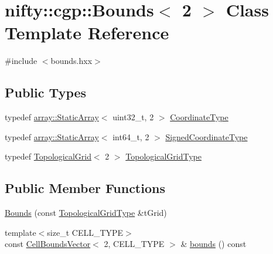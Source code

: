 \hypertarget{classnifty_1_1cgp_1_1Bounds_3_012_01_4}{}\section{nifty\+:\+:cgp\+:\+:Bounds$<$ 2 $>$ Class Template Reference}
\label{classnifty_1_1cgp_1_1Bounds_3_012_01_4}


{\ttfamily \#include $<$bounds.\+hxx$>$}

\subsection*{Public Types}
\begin{DoxyCompactItemize}
\item 
typedef \hyperlink{namespacenifty_1_1array_a683f151f19c851754e0c6d55ed16a0c2}{array\+::\+Static\+Array}$<$ uint32\+\_\+t, 2 $>$ \hyperlink{classnifty_1_1cgp_1_1Bounds_3_012_01_4_aa7c3be371d84aea05e916a30d859d7ff}{Coordinate\+Type}
\item 
typedef \hyperlink{namespacenifty_1_1array_a683f151f19c851754e0c6d55ed16a0c2}{array\+::\+Static\+Array}$<$ int64\+\_\+t, 2 $>$ \hyperlink{classnifty_1_1cgp_1_1Bounds_3_012_01_4_aa2abaddff55015fc8a158881f4e90571}{Signed\+Coordinate\+Type}
\item 
typedef \hyperlink{classnifty_1_1cgp_1_1TopologicalGrid}{Topological\+Grid}$<$ 2 $>$ \hyperlink{classnifty_1_1cgp_1_1Bounds_3_012_01_4_a97f375ade92ba9870b7a31da87626337}{Topological\+Grid\+Type}
\end{DoxyCompactItemize}
\subsection*{Public Member Functions}
\begin{DoxyCompactItemize}
\item 
\hyperlink{classnifty_1_1cgp_1_1Bounds_3_012_01_4_aadcad33a9b3fa58464bae7aae61f3f5d}{Bounds} (const \hyperlink{classnifty_1_1cgp_1_1Bounds_3_012_01_4_a97f375ade92ba9870b7a31da87626337}{Topological\+Grid\+Type} \&t\+Grid)
\item 
{\footnotesize template$<$size\+\_\+t C\+E\+L\+L\+\_\+\+T\+Y\+PE$>$ }\\const \hyperlink{classnifty_1_1cgp_1_1CellBoundsVector}{Cell\+Bounds\+Vector}$<$ 2, C\+E\+L\+L\+\_\+\+T\+Y\+PE $>$ \& \hyperlink{classnifty_1_1cgp_1_1Bounds_3_012_01_4_a169f3c4bb30362d91ac8536d9d4800c4}{bounds} () const
\end{DoxyCompactItemize}


